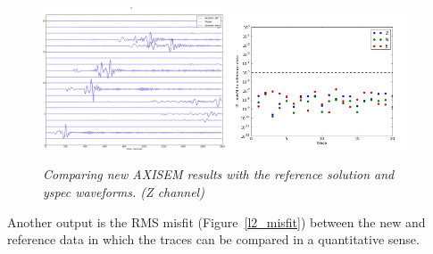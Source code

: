 \begin{figure}
  \includegraphics[width=0.48\textwidth]{./PYAXI/record_section_Z.png}
  \includegraphics[width=0.48\textwidth]{./PYAXI/l2_misfit.png}
  \caption{\textit{Comparing new AXISEM results with the reference solution and \textit{yspec} waveforms. (Z channel)}}
  \label{channel_Z}
\end{figure}

\noindent Another output is the RMS misfit (Figure~\ref{l2_misfit}) between the new and reference data
in which the traces can be compared in a quantitative sense.

%
